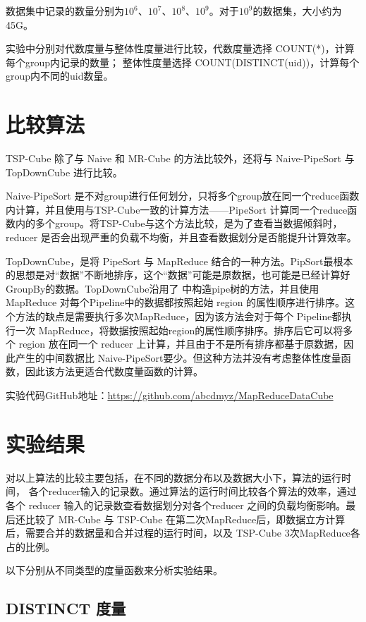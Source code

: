 数据集中记录的数量分别为${10}^{6}$、${10}^{7}$、${10}^{8}$、${10}^{9}$。对于${10}^{9}$的数据集，大小约为45G。

实验中分别对代数度量与整体性度量进行比较，代数度量选择 COUNT(*)，计算每个group内记录的数量； 整体性度量选择 COUNT(DISTINCT(uid))，计算每个group内不同的uid数量。




\section{比较算法}

TSP-Cube 除了与 Naive 和 MR-Cube 的方法比较外，还将与 Naive-PipeSort 与 TopDownCube \cite{lee2012efficient} 进行比较。

Naive-PipeSort 是不对group进行任何划分，只将多个group放在同一个reduce函数内计算，并且使用与TSP-Cube一致的计算方法——PipeSort 计算同一个reduce函数内的多个group。将TSP-Cube与这个方法比较，是为了查看当数据倾斜时，reducer 是否会出现严重的负载不均衡，并且查看数据划分是否能提升计算效率。

TopDownCube，是将 PipeSort 与 MapReduce 结合的一种方法。PipSort最根本的思想是对``数据”不断地排序，这个``数据”可能是原数据，也可能是已经计算好GroupBy的数据。TopDownCube沿用了\cite{agarwal1996computation} 中构造pipe树的方法，并且使用 MapReduce 对每个Pipeline中的数据都按照起始 region 的属性顺序进行排序。这个方法的缺点是需要执行多次MapReduce，因为该方法会对于每个 Pipeline都执行一次 MapReduce，将数据按照起始region的属性顺序排序。排序后它可以将多个 region 放在同一个 reducer 上计算，并且由于不是所有排序都基于原数据，因此产生的中间数据比 Naive-PipeSort要少。但这种方法并没有考虑整体性度量函数，因此该方法更适合代数度量函数的计算。

实验代码GitHub地址：\url{https://github.com/abcdmyz/MapReduceDataCube}

\section{实验结果}

对以上算法的比较主要包括，在不同的数据分布以及数据大小下，算法的运行时间， 各个reducer输入的记录数。通过算法的运行时间比较各个算法的效率，通过各个 reducer 输入的记录数查看数据划分对各个reducer 之间的负载均衡影响。最后还比较了 MR-Cube 与 TSP-Cube 在第二次MapReduce后，即数据立方计算后，需要合并的数据量和合并过程的运行时间，以及 TSP-Cube 3次MapReduce各占的比例。

以下分别从不同类型的度量函数来分析实验结果。

\subsection{DISTINCT 度量}


